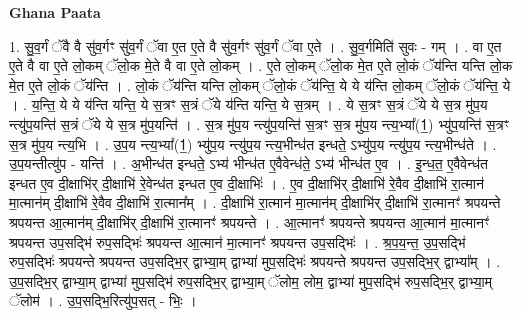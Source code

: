 \documentclass[17pt]{extarticle}
\begin{document}
\textbf{Ghana Paata } \newline

1. सु॒व॒र्गं ॅवै वै सु॑व॒र्गꣳ सु॑व॒र्गं ॅवा ए॒त ए॒ते वै सु॑व॒र्गꣳ सु॑व॒र्गं ॅवा ए॒ते । . सु॒व॒र्गमिति॑ सुवः - गम् । . वा ए॒त ए॒ते वै वा ए॒ते लो॒कम् ॅलो॒क मे॒ते वै वा ए॒ते लो॒कम् । . ए॒ते लो॒कम् ॅलो॒क मे॒त ए॒ते लो॒कं ॅय॑न्ति यन्ति लो॒क मे॒त ए॒ते लो॒कं ॅय॑न्ति । . लो॒कं ॅय॑न्ति यन्ति लो॒कम् ॅलो॒कं ॅय॑न्ति॒ ये ये य॑न्ति लो॒कम् ॅलो॒कं ॅय॑न्ति॒ ये । . य॒न्ति॒ ये ये य॑न्ति यन्ति॒ ये स॒त्रꣳ स॒त्रं ॅये य॑न्ति यन्ति॒ ये स॒त्रम् । . ये स॒त्रꣳ स॒त्रं ॅये ये स॒त्र मु॑प॒य न्त्यु॑प॒यन्ति॑ स॒त्रं ॅये ये स॒त्र मु॑प॒यन्ति॑ । . स॒त्र मु॑प॒य न्त्यु॑प॒यन्ति॑ स॒त्रꣳ स॒त्र मु॑प॒य न्त्य॒भ्या᳚(1॒) भ्यु॑प॒यन्ति॑ स॒त्रꣳ स॒त्र मु॑प॒य न्त्य॒भि । . उ॒प॒य न्त्य॒भ्या᳚(1॒) भ्यु॑प॒य न्त्यु॑प॒य न्त्य॒भीन्ध॑त इन्धते॒ ऽभ्यु॑प॒य न्त्यु॑प॒य न्त्य॒भीन्ध॑ते । . उ॒प॒यन्तीत्यु॑प - यन्ति॑ । . अ॒भीन्ध॑त इन्धते॒ ऽभ्य॑ भीन्ध॑त ए॒वैवेन्ध॑ते॒ ऽभ्य॑ भीन्ध॑त ए॒व । . इ॒न्ध॒त॒ ए॒वैवेन्ध॑त इन्धत ए॒व दी॒क्षाभि॑र् दी॒क्षाभि॑ रे॒वेन्ध॑त इन्धत ए॒व दी॒क्षाभिः॑ । . ए॒व दी॒क्षाभि॑र् दी॒क्षाभि॑ रे॒वैव दी॒क्षाभि॑ रा॒त्मान॑ मा॒त्मान॑म् दी॒क्षाभि॑ रे॒वैव दी॒क्षाभि॑ रा॒त्मान᳚म् । . दी॒क्षाभि॑ रा॒त्मान॑ मा॒त्मान॑म् दी॒क्षाभि॑र् दी॒क्षाभि॑ रा॒त्मानꣳ॑ श्रपयन्ते श्रपयन्त आ॒त्मान॑म् दी॒क्षाभि॑र् दी॒क्षाभि॑ रा॒त्मानꣳ॑ श्रपयन्ते । . आ॒त्मानꣳ॑ श्रपयन्ते श्रपयन्त आ॒त्मान॑ मा॒त्मानꣳ॑ श्रपयन्त उप॒सद्भि॑ रुप॒सद्भिः॑ श्रपयन्त आ॒त्मान॑ मा॒त्मानꣳ॑ श्रपयन्त उप॒सद्भिः॑ । . श्र॒प॒य॒न्त॒ उ॒प॒सद्भि॑ रुप॒सद्भिः॑ श्रपयन्ते श्रपयन्त उप॒सद्भि॒र् द्वाभ्या॒म् द्वाभ्या॑ मुप॒सद्भिः॑ श्रपयन्ते श्रपयन्त उप॒सद्भि॒र् द्वाभ्या᳚म् । . उ॒प॒सद्भि॒र् द्वाभ्या॒म् द्वाभ्या॑ मुप॒सद्भि॑ रुप॒सद्भि॒र् द्वाभ्या॒म् ॅलोम॒ लोम॒ द्वाभ्या॑ मुप॒सद्भि॑ रुप॒सद्भि॒र् द्वाभ्या॒म् ॅलोम॑ । . उ॒प॒सद्भि॒रित्यु॑प॒सत् - भिः॒ । \newline
\end{document}
